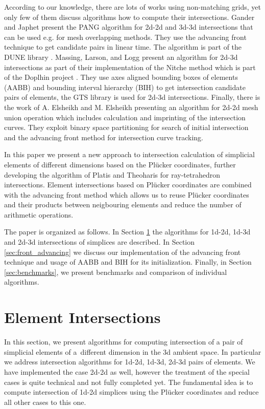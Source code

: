 \documentclass{elsarticle}
\newcommand{\plucker}{Pl\"{u}cker }
\begin{document}
According to our knowledge, there are lots of works using non-matching grids, yet only few of them discuss algorithms how to compute their intersections. 
Gander and Japhet \cite{gander_algorithm_2013} present the PANG algorithm for 2d-2d and 3d-3d intersections that can be used e.g. for mesh overlapping methods.
They use the advancing front technique to get candidate pairs in linear time. The algorithm is part of the DUNE library \cite{bastian_towards_2005}.
Massing, Larson, and Logg \cite{massing_efficient_2013} present an algorithm for 2d-3d intersections as part of their implementation of the Nitche method 
which is part of the Doplhin project \cite{Dolphin}. They use axes aligned bounding boxes of elements (AABB) and bounding interval hierarchy (BIH) 
to get intersection candidate pairs of elements, the GTS library \cite{gtslib} is used for 2d-3d intersections. 
Finally, there is the work of A. Elsheikh and M. Elsheikh \cite{elsheikh_reliable_2012} presenting an algorithm for 2d-2d mesh union operation which includes 
calculation and imprinting of the intersection curves. They exploit binary space partitioning for search of initial intersection and 
the advancing front method for intersection curve tracking. 

In this paper we present a new approach to intersection calculation of simplicial elements of different dimensions based on the \plucker coordinates,
further developing the algorithm of Platis and Theoharis \cite{platis_fast_2003} for ray-tetrahedron intersections. Element intersections based on 
\plucker coordinates are combined with the advancing front method which allows us to reuse \plucker coordinates and their products between neigbouring
elements and reduce the number of arithmetic operations. 

The paper is organized as follows. In Section \ref{sec:element intersecitons} the algorithms for
1d-2d, 1d-3d and 2d-3d intersections of simplices are described. In Section \ref{sec:front_advancing} we discuss our implementation of the advancing front 
technique and usage of AABB and BIH for its initialization. Finally, in Section \ref{sec:benchmarks}, we present benchmarks and comparison of individual algorithms.


\section{Element Intersections}
\label{sec:element intersecitons}
In this section, we present algorithms for computing intersection of a pair of simplicial elements of a~different dimension in the 3d ambient space. 
In particular we address intersection algorithms for 1d-2d, 1d-3d, 2d-3d pairs of elements. We have implemented the case 2d-2d as well, however the treatment 
of the special cases is quite technical and not fully completed yet. The fundamental idea is to compute intersection of 1d-2d simplices using the 
\plucker coordinates and reduce all other cases to this one. 
\end{document}
